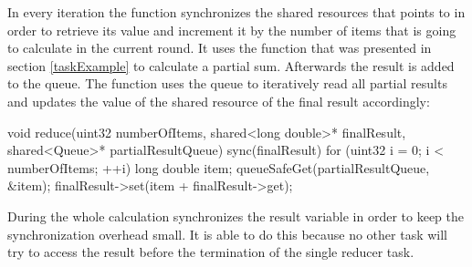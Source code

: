 In every iteration the function synchronizes the shared resources that  points to in order to retrieve its value and increment it by the number of items that  is going to calculate in the current round. It uses the  function that was presented in section \ref{taskExample} to calculate a partial sum. Afterwards the result is added to the queue. 
The  function uses the queue to iteratively read all partial results and updates the value of the shared resource of the final result accordingly:
\begin{ccode}
void reduce(uint32 numberOfItems, shared<long double>* finalResult, shared<Queue>* partialResultQueue) {
  sync(finalResult) { 
    for (uint32 i = 0; i < numberOfItems; ++i) { 
      long double item; 
      queueSafeGet(partialResultQueue, &item); 
      finalResult->set(item + finalResult->get); 
    }
  }
}
\end{ccode}
During the whole calculation  synchronizes the result variable in order to keep the synchronization overhead small. It is able to do this because no other task will try to access the result before the termination of the single reducer task.

